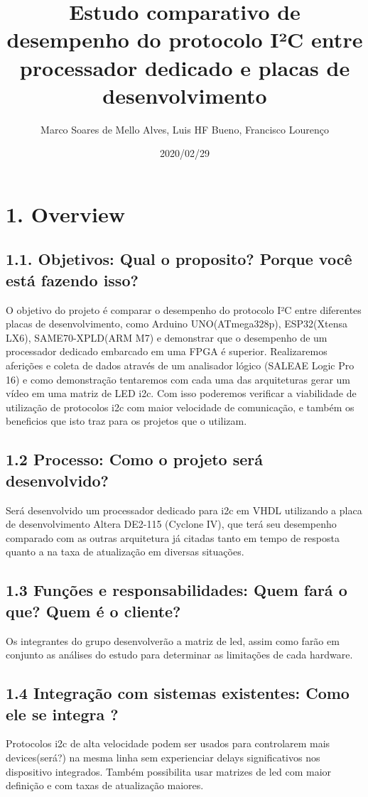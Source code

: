 \documentclass[11pt]{article}
\author{Marco Soares de Mello Alves, Luis HF Bueno, Francisco Lourenço}
\date{2020/02/29}
\title{Estudo comparativo de desempenho do protocolo I²C entre processador dedicado e placas de desenvolvimento}
\begin{document}
\maketitle
\tableofcontents



\section{1. Overview}
\label{sec:org9343e63}
\subsection{1.1. Objetivos: Qual o proposito? Porque você está fazendo isso?}
\label{sec:orgb7ea407}
O objetivo do projeto é comparar o desempenho do protocolo I²C entre diferentes placas de desenvolvimento, como Arduino UNO(ATmega328p), ESP32(Xtensa LX6), SAME70-XPLD(ARM M7) e demonstrar que o desempenho de um processador dedicado embarcado em uma FPGA é superior. Realizaremos aferições e coleta de dados através de um analisador lógico (SALEAE Logic Pro 16) e como demonstração tentaremos com cada uma das arquiteturas gerar um vídeo em uma matriz de LED i2c. Com isso poderemos verificar a viabilidade de utilização de protocolos i2c com maior velocidade de comunicação, e também os beneficios que isto traz para os projetos que o utilizam.
\subsection{1.2 Processo: Como o projeto será desenvolvido?}
\label{sec:org35cefe1}
Será desenvolvido um processador dedicado para i2c em VHDL utilizando a placa de desenvolvimento Altera DE2-115 (Cyclone IV), que terá seu desempenho comparado com as outras arquitetura já citadas tanto em tempo de resposta quanto a na taxa de atualização em diversas situações.
\subsection{1.3 Funções e responsabilidades: Quem fará o que? Quem é o cliente?}
\label{sec:org300da3e}
Os integrantes do grupo desenvolverão a matriz de led, assim como farão em conjunto as análises do estudo para determinar as limitações de cada hardware.
\subsection{1.4 Integração com sistemas existentes: Como ele se integra ?}
\label{sec:org60ca817}
Protocolos i2c de alta velocidade podem ser usados para controlarem mais devices(será?) na mesma linha sem experienciar delays significativos nos dispositivo integrados. Também possibilita usar matrizes de led com maior definição e com taxas de atualização maiores.   
\end{document}
